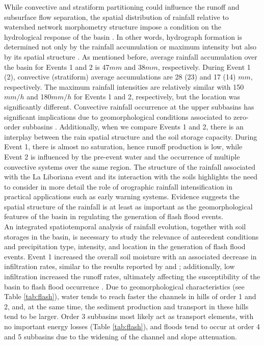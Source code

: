 \documentclass[hess, manuscript]{copernicus}
\begin{document}
While convective and stratiform partitioning could influence the runoff and subsurface flow separation, the spatial distribution of rainfall relative to watershed network morphometry structure impose a condition on the hydrological response of the basin \citep{Douinot2016}. In other words, hydrograph formation is determined  not only by the rainfall accumulation or maximum intensity but also by its spatial structure \citep{Zoccatelli2011,Douinot2016}. As mentioned before, average rainfall accumulation over the basin for Events 1 and 2 is 47$mm$ and 38$mm$, respectively. During  Event 1 (2), convective (stratiform) average accumulations are 28 (23) and 17 (14) $mm$, respectively.  The maximum rainfall intensities are relatively similar with 150$mm/h$ and 180$mm/h$ for Events 1 and 2, respectively, but the location was significantly different.  Convective rainfall occurrence at the upper subbasins has significant implications due to geomorphological conditions associated to zero-order subbasins \citep{Sidle2018}. Additionally, when we compare Events 1 and 2, there is an interplay between the rain spatial structure and the soil storage capacity. During Event 1, there is almost no saturation, hence runoff production is low, while Event 2 is influenced by the pre-event water and the occurrence of multiple convective systems over the same region.  The structure of the rainfall associated with the La Liboriana event and its interaction with the soils highlights the need to consider in more detail the role of orographic rainfall intensification in practical applications such as early warning systems.  Evidence suggests the spatial structure of the rainfall is at least as important as the geomorphological features of the basin in regulating the generation of flash flood events.\\

An integrated spatiotemporal analysis of rainfall evolution, together with soil storages in the basin, is necessary to study the relevance of antecedent conditions and precipitation type, intensity, and location in the generation of flash flood events.  Event 1 increased the overall soil moisture with an associated decrease in infiltration rates, similar to the results reported by \citet{Marchi2010,Penna2011} and \citet{Zehe2010}; additionally, low infiltration increased the runoff rates, ultimately affecting the susceptibility of the basin to  flash flood occurrence \citep{Wagner1999,Penna2011,Tramblay2012b}. Due to geomorphological characteristics (see Table \ref{tab:flash}), water tends to reach faster the channels in hills of order 1 and 2, and, at the same time, the sediment production and transport in these hills tend to be larger.  Order 3 subbasins most likely act as transport elements, with no important energy losses (Table \ref{tab:flash}), and floods tend to occur at order 4 and 5 subbasins due to the widening of the channel and slope attenuation.\\
\end{document}
